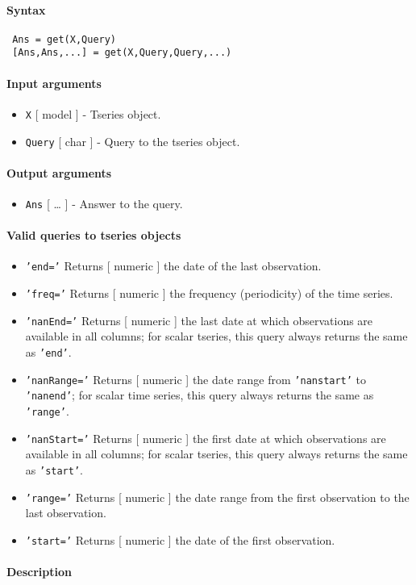 


	\paragraph{Syntax}
 
 \begin{verbatim}
 Ans = get(X,Query)
 [Ans,Ans,...] = get(X,Query,Query,...)
 \end{verbatim}
 
 \paragraph{Input arguments}
 
 \begin{itemize}
 \item
   \texttt{X} {[} model {]} - Tseries object.
 \item
   \texttt{Query} {[} char {]} - Query to the tseries object.
 \end{itemize}
 
 \paragraph{Output arguments}
 
 \begin{itemize}
 \item
   \texttt{Ans} {[} \ldots{} {]} - Answer to the query.
 \end{itemize}
 
 \paragraph{Valid queries to tseries objects}
 
 \begin{itemize}
 \item
   \texttt{'end='} Returns {[} numeric {]} the date of the last
   observation.
 \item
   \texttt{'freq='} Returns {[} numeric {]} the frequency (periodicity)
   of the time series.
 \item
   \texttt{'nanEnd='} Returns {[} numeric {]} the last date at which
   observations are available in all columns; for scalar tseries, this
   query always returns the same as \texttt{'end'}.
 \item
   \texttt{'nanRange='} Returns {[} numeric {]} the date range from
   \texttt{'nanstart'} to \texttt{'nanend'}; for scalar time series, this
   query always returns the same as \texttt{'range'}.
 \item
   \texttt{'nanStart='} Returns {[} numeric {]} the first date at which
   observations are available in all columns; for scalar tseries, this
   query always returns the same as \texttt{'start'}.
 \item
   \texttt{'range='} Returns {[} numeric {]} the date range from the
   first observation to the last observation.
 \item
   \texttt{'start='} Returns {[} numeric {]} the date of the first
   observation.
 \end{itemize}
 
 \paragraph{Description}


